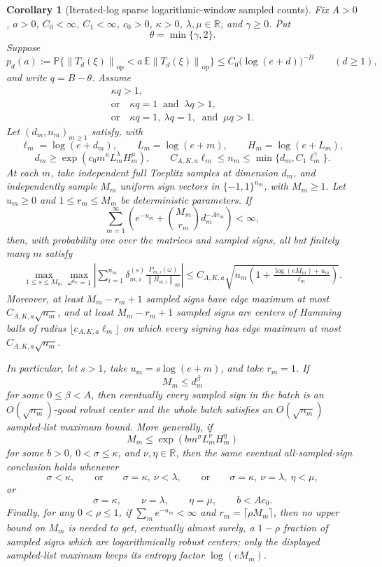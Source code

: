 \documentclass[11pt]{amsart}
\numberwithin{equation}{section}
\newtheorem{corollary}[theorem]{Corollary}
\theoremstyle{definition}
\theoremstyle{remark}
\newcommand{\op}{\mathrm{op}}
\newcommand{\Prob}{\mathbb P}
\newcommand{\Exp}{\mathbb E}
\newcommand{\norm}[1]{\left\lVert #1\right\rVert}
\begin{document}
\begin{corollary}[Iterated-log sparse logarithmic-window sampled counts]
\label{cor:normalizer-tail-borel-window-iterlog-counts}
Fix \(A>0\), \(a>0\), \(C_0<\infty\), \(C_1<\infty\), \(c_0>0\),
\(\kappa>0\), \(\lambda,\mu\in\mathbb R\), and \(\gamma\ge0\).  Put
\[
  \theta=\min\{\gamma,2\}.
\]
Suppose
\[
  p_d(a):=\Prob\{\norm{T_d(\xi)}_{\op}<a\,\Exp\norm{T_d(\xi)}_{\op}\}
  \le C_0\bigl(\log(e+d)\bigr)^{-B}
  \qquad(d\ge1),
\]
and write \(q=B-\theta\).  Assume
\[
\begin{gathered}
  \kappa q>1,\\
  \text{or}\quad \kappa q=1\ \text{ and }\ \lambda q>1,\\
  \text{or}\quad \kappa q=1,\ \lambda q=1,\ \text{ and }\ \mu q>1 .
\end{gathered}
\]
Let \((d_m,n_m)_{m\ge1}\) satisfy, with
\[
  \ell_m=\log(e+d_m),\qquad
  L_m=\log(e+m),\qquad
  H_m=\log(e+L_m),
\]
\[
  d_m\ge\exp(c_0m^\kappa L_m^\lambda H_m^\mu),
  \qquad
  C_{A,K,a}\ell_m\le n_m\le \min\{d_m,C_1\ell_m^\gamma\}.
\]
At each \(m\), take independent full Toeplitz samples at dimension \(d_m\), and
independently sample \(M_m\) uniform sign vectors in \(\{-1,1\}^{n_m}\), with
\(M_m\ge1\).  Let \(u_m\ge0\) and \(1\le r_m\le M_m\) be deterministic
parameters.  If
\[
  \sum_{m=1}^{\infty}
  \left(e^{-u_m}+\binom{M_m}{r_m}d_m^{-A r_m}\right)<\infty,
\]
then, with probability one over the matrices and sampled signs, all but
finitely many \(m\) satisfy
\[
\begin{aligned}
  \max_{1\le s\le M_m}\max_{\omega^{d_m}=1}
  \left|\sum_{i=1}^{n_m}\delta_{m,i}^{(s)}
  \frac{P_{m,i}(\omega)}{\norm{B_{m,i}}_{\op}}\right|
  \le
  C_{A,K,a}\sqrt{
    n_m\left(1+\frac{\log(eM_m)+u_m}{\ell_m}\right)} .
\end{aligned}
\]
Moreover, at least \(M_m-r_m+1\) sampled signs have edge maximum at most
\(C_{A,K,a}\sqrt{n_m}\), and at least \(M_m-r_m+1\) sampled signs are centers
of Hamming balls of radius \(\lfloor c_{A,K,a}\ell_m\rfloor\) on which every
signing has edge maximum at most \(C_{A,K,a}\sqrt{n_m}\).

In particular, let \(s>1\), take \(u_m=s\log(e+m)\), and take \(r_m=1\).  If
\[
  M_m\le d_m^\beta
\]
for some \(0\le\beta<A\), then eventually every sampled sign in the batch is an
\(O(\sqrt{n_m})\)-good robust center and the whole batch satisfies an
\(O(\sqrt{n_m})\) sampled-list maximum bound.  More generally, if
\[
  M_m\le \exp(bm^\sigma L_m^\nu H_m^\eta)
\]
for some \(b>0\), \(0<\sigma\le\kappa\), and \(\nu,\eta\in\mathbb R\), then the
same eventual all-sampled-sign conclusion holds whenever
\[
  \sigma<\kappa,
  \qquad\text{or}\qquad
  \sigma=\kappa,\ \nu<\lambda,
  \qquad\text{or}\qquad
  \sigma=\kappa,\ \nu=\lambda,\ \eta<\mu,
\]
or
\[
  \sigma=\kappa,\qquad \nu=\lambda,\qquad \eta=\mu,\qquad b<Ac_0 .
\]
Finally, for any \(0<\rho\le1\), if \(\sum_m e^{-u_m}<\infty\) and
\(r_m=\lceil\rho M_m\rceil\), then no upper bound on \(M_m\) is needed to get,
eventually almost surely, a \(1-\rho\) fraction of sampled signs which are
logarithmically robust centers; only the displayed sampled-list maximum keeps
its entropy factor \(\log(eM_m)\).
\end{corollary}
\end{document}
